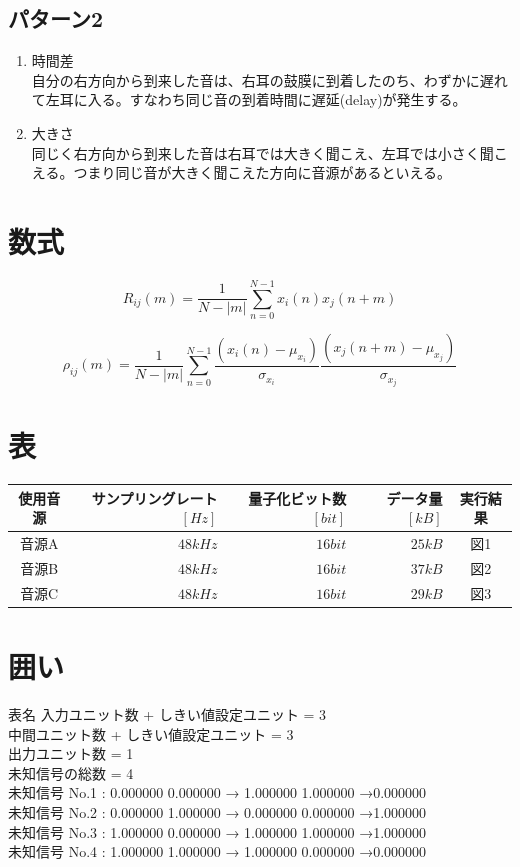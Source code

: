 \documentclass[dvipdfmx]{jsarticle}
\begin{document}
\subsection{パターン2}
\begin{enumerate}
\item 時間差\\
自分の右方向から到来した音は、右耳の鼓膜に到着したのち、わずかに遅れて左耳に入る。すなわち同じ音の到着時間に遅延(delay)が発生する。
\item 大きさ\\
同じく右方向から到来した音は右耳では大きく聞こえ、左耳では小さく聞こえる。つまり同じ音が大きく聞こえた方向に音源があるといえる。
\end{enumerate}

\section{数式}
\begin{equation}
R_{ij}(m)=\frac{1}{N-|m|} \sum_{n=0}^{N-1}x_{i}(n)x_{j}(n+m)
\end{equation}

\begin{equation}
\rho_{ij}(m)=\frac{1}{N-|m|} \sum_{n=0}^{N-1}\frac{(x_{i}(n)-\mu_{x_{i}})}{\sigma_{x_i}}\frac{(x_j(n+m)-\mu_{x_j})}{\sigma_{x_j}}
\end{equation}

\section{表}
\begin{tabular}{|c|r|r|r|c|}
\hline
使用音源 & サンプリングレート$[Hz]$ & 量子化ビット数$[bit]$ & データ量$[kB]$ & 実行結果 \\ 
\hline
音源A & $48kHz$ & $16bit$ & $25kB$ & 図1 \\ 
\hline
音源B & $48kHz$ & $16bit$ & $37kB$ & 図2 \\
\hline
音源C & $48kHz$ & $16bit$ & $29kB$ & 図3 \\
\hline
\end{tabular}

\section{囲い}
\begin{itembox}[|]{表名}
  入力ユニット数 + しきい値設定ユニット = 3\\
  中間ユニット数 + しきい値設定ユニット = 3\\
  出力ユニット数 = 1\\
  未知信号の総数 = 4\\
  未知信号 No.1 : 0.000000 0.000000  → 1.000000 1.000000 →0.000000\\
  未知信号 No.2 : 0.000000 1.000000  → 0.000000 0.000000 →1.000000\\
  未知信号 No.3 : 1.000000 0.000000  → 1.000000 1.000000 →1.000000\\
  未知信号 No.4 : 1.000000 1.000000  → 1.000000 0.000000 →0.000000
\end{itembox}
\end{document}
